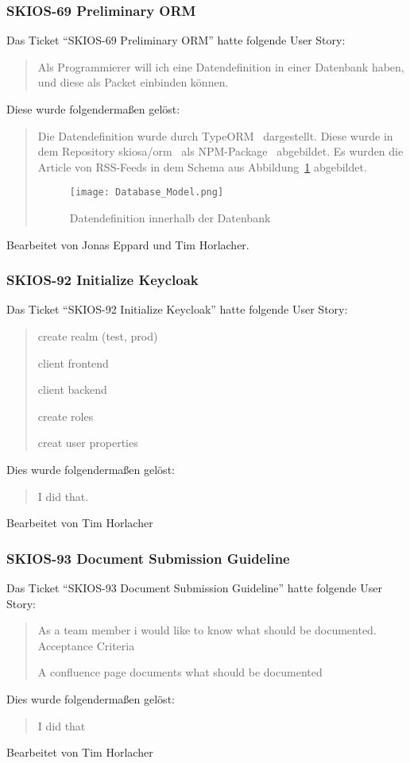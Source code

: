 \subsubsection{SKIOS-69 Preliminary ORM}
Das Ticket \enquote{SKIOS-69 Preliminary ORM} hatte folgende User Story:
\begin{quotation}
    Als Programmierer will ich eine Datendefinition in einer Datenbank
    haben, und diese als Packet einbinden können.
\end{quotation}
Diese wurde folgendermaßen gelöst:
\begin{quotation}
Die Datendefinition wurde durch TypeORM~\parencite{web/TypeORM} dargestellt.
Diese wurde in dem Repository skiosa/orm~\parencite{git/skiosa/orm} als NPM-Package~\parencite{web/npm} abgebildet.
Es wurden die Article von RSS-Feeds in dem Schema aus Abbildung~\ref{fig:databaseORM} abgebildet.
\begin{figure}
    \texttt{[image: Database\_Model.png]}
    \caption{Datendefinition innerhalb der Datenbank}
    \label{fig:databaseORM}
\end{figure}
\end{quotation}
Bearbeitet von Jonas Eppard und Tim Horlacher.

\subsubsection{SKIOS-92 Initialize Keycloak}
Das Ticket \enquote{SKIOS-92 Initialize Keycloak} hatte folgende User Story:
\begin{quotation}
    create realm (test, prod)

    client frontend

    client backend

    create roles

    creat user properties
\end{quotation}
Dies wurde folgendermaßen gelöst:
\begin{quotation}
    I did that.
\end{quotation}
Bearbeitet von Tim Horlacher

\subsubsection{SKIOS-93 Document Submission Guideline}
Das Ticket \enquote{SKIOS-93 Document Submission Guideline} hatte folgende User Story:
\begin{quotation}
    As a team member i would like to know what should be documented.
Acceptance Criteria

    A confluence page documents what should be documented
\end{quotation}
Dies wurde folgendermaßen gelöst:
\begin{quotation}
    I did that
\end{quotation}
Bearbeitet von Tim Horlacher

